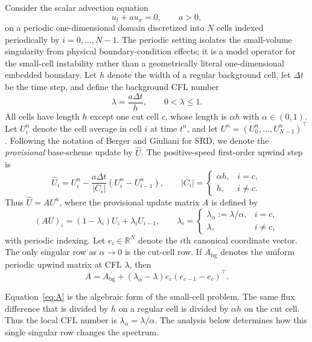 \documentclass[preprint,12pt]{elsarticle}
\begin{document}
Consider the scalar advection equation
\begin{equation}
    u_t+a u_x=0,\qquad a>0,
    \label{eq:advection}
\end{equation}
on a periodic one-dimensional domain discretized into $N$ cells indexed
periodically by $i=0,\ldots,N-1$.  The periodic setting isolates the
small-volume singularity from physical boundary-condition effects; it is a
model operator for the small-cell instability rather than a geometrically literal
one-dimensional embedded boundary.  Let $h$ denote the width of a regular
background cell, let $\Delta t$ be the time step, and define the background
CFL number
\[
    \lambda=\frac{a\Delta t}{h},\qquad 0<\lambda\le1.
\]
All cells have length $h$ except one cut cell $c$, whose length is
$\alpha h$ with $\alpha\in(0,1)$.  Let $U_i^n$ denote the cell average in
cell $i$ at time $t^n$, and let $U^n=(U_0^n,\ldots,U_{N-1}^n)^\top$.
Following the notation of Berger and Giuliani for SRD, we denote the
\emph{provisional} base-scheme update by $\widehat U$.  The positive-speed
first-order upwind step is
\[
 \widehat U_i
 =
 U_i^n-\frac{a\Delta t}{|C_i|}
 \left(U_i^n-U_{i-1}^n\right),
 \qquad
 |C_i|=\begin{cases}\alpha h,&i=c,\\ h,&i\ne c.\end{cases}
\]
Thus $\widehat U=AU^n$, where the provisional update matrix $A$ is defined by
\begin{equation}
    (AU)_i=(1-\lambda_i)U_i+\lambda_i U_{i-1},
    \qquad
    \lambda_i=
    \begin{cases}
        \lambda_\alpha:=\lambda/\alpha, & i=c,\\
        \lambda, & i\ne c,
    \end{cases}
    \label{eq:A}
\end{equation}
with periodic indexing.  Let $e_i\in\mathbb R^N$ denote the $i$th canonical
coordinate vector.  The only singular row as $\alpha\to0$ is the cut-cell
row.  If $A_{\mathrm{bg}}$ denotes the uniform periodic upwind matrix at CFL $\lambda$,
then
\begin{equation}
    A
    =
    A_{\mathrm{bg}}+(\lambda_\alpha-\lambda)e_c(e_{c-1}-e_c)^\top.
    \label{eq:rankone}
\end{equation}

Equation~\eqref{eq:A} is the algebraic form of the small-cell problem.  The
same flux difference that is divided by $h$ on a regular cell is divided by
$\alpha h$ on the cut cell.  Thus the local CFL number is
$\lambda_\alpha=\lambda/\alpha$.  The analysis below determines how this
single singular row changes the spectrum.
\end{document}
